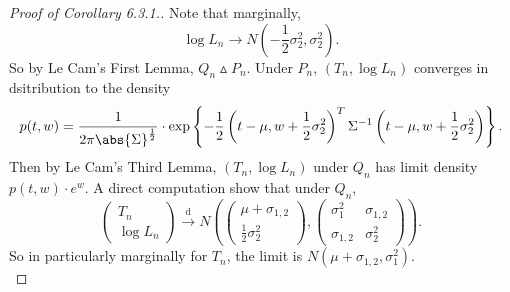 \documentclass[a4paper]{article}
\begin{document}
\begin{eg}
	\begin{proof}[Proof of Corollary 6.3.1.]
		Note that marginally,
		\begin{equation*}
			\log L_n \to N\left(-\frac{1}{2}\sigma_2^2,\sigma_2^2\right).
		\end{equation*}
		So by Le Cam's First Lemma, $Q_n \vartriangle P_n$. Under $P_n$, $(T_n,\log L_n)$ converges in dsitribution to the density
		\begin{equation*}
			p(t,w) = \frac{1}{2\pi \abs{\Sigma}^{\frac{1}{2}}} \cdot \exp \left\{-\frac{1}{2} \left(t - \mu, w + \frac{1}{2} \sigma_2^2 \right)^T \Sigma^{-1} \left(t - \mu, w + \frac{1}{2} \sigma_2^2\right)\right\}.
		\end{equation*}
		Then by Le Cam's Third Lemma, $(T_n,\log L_n)$ under $Q_n$ has limit density $p(t,w) \cdot e^w$. A direct computation show that under $Q_n$,
		\begin{equation*}
			\begin{pmatrix}
				T_n \\
				\log L_n
			\end{pmatrix} \stackrel{\text{d}}{\longrightarrow}
			N \left(\begin{pmatrix}
				\mu + \sigma_{1,2} \\
				\frac{1}{2}\sigma_2^2
			\end{pmatrix},
			\begin{pmatrix}
				\sigma_1^2 & \sigma_{1,2} \\
				\sigma_{1,2} & \sigma_2^2
			\end{pmatrix}\right).
		\end{equation*} 
		So in particularly marginally for $T_n$, the limit is $N\left(\mu+\sigma_{1,2},\sigma_1^2\right)$. \\
	\end{proof}


\end{eg}
\end{document}
